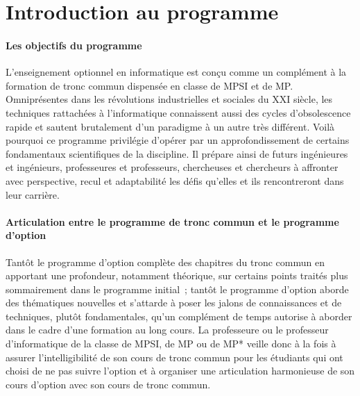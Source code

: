 \section*{Introduction au programme}

\paragraph{Les objectifs du programme} L'enseignement optionnel en informatique est conçu comme un complément à la formation de tronc commun dispensée en classe de MPSI et de MP.
Omniprésentes dans les révolutions industrielles et sociales du XXI\ieme{} siècle,
les techniques rattachées à l'informatique connaissent aussi des cycles d'obsolescence rapide et sautent brutalement d'un paradigme à un autre très différent.
Voilà pourquoi ce programme privilégie d'opérer par un approfondissement de certains fondamentaux scientifiques de la discipline.
Il prépare ainsi de futurs ingénieures et ingénieurs, professeures et professeurs, chercheuses et chercheurs à affronter avec perspective, recul et adaptabilité les défis qu'elles et ils rencontreront dans leur carrière.


\paragraph{Articulation entre le programme de tronc commun et le programme d'option} 
Tantôt le programme d'option complète des chapitres du tronc commun en apportant une profondeur, notamment théorique, sur certains points traités plus sommairement dans le programme initial~; tantôt le programme d'option aborde des thématiques nouvelles 
et s'attarde à poser les jalons de connaissances et de techniques, plutôt fondamentales,
qu'un complément de temps autorise à aborder dans le cadre d'une formation au long cours.
La professeure ou le professeur d'informatique de la classe de 
MPSI, de MP ou de MP* 
veille donc à la fois à assurer l'intelligibilité de son cours de tronc commun pour les étudiants qui ont choisi de ne pas suivre l'option et à organiser une articulation harmonieuse de son cours d'option avec son cours de tronc commun.



